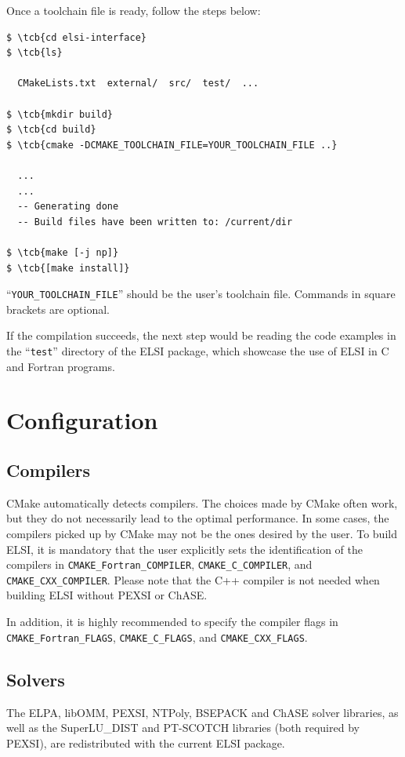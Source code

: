\documentclass{report}
\newcommand{\tcb}[1]{\textcolor{blue}{#1}}
\begin{document}
Once a toolchain file is ready, follow the steps below:
\begin{tcolorbox}
\begin{Verbatim}[commandchars=\\\{\}]
$ \tcb{cd elsi-interface}
$ \tcb{ls}

  CMakeLists.txt  external/  src/  test/  ...

$ \tcb{mkdir build}
$ \tcb{cd build}
$ \tcb{cmake -DCMAKE_TOOLCHAIN_FILE=YOUR_TOOLCHAIN_FILE ..}

  ...
  ...
  -- Generating done
  -- Build files have been written to: /current/dir

$ \tcb{make [-j np]}
$ \tcb{[make install]}
\end{Verbatim}
\end{tcolorbox}

``\texttt{YOUR\_TOOLCHAIN\_FILE}'' should be the user's toolchain file. Commands in square brackets are optional.

If the compilation succeeds, the next step would be reading the code examples in the ``\texttt{test}'' directory of the ELSI package, which showcase the use of ELSI in C and Fortran programs.

\section{Configuration}
\label{sec:config}
\subsection{Compilers}
\label{subsec:config_compilers}
CMake automatically detects compilers. The choices made by CMake often work, but they do not necessarily lead to the optimal performance. In some cases, the compilers picked up by CMake may not be the ones desired by the user. To build ELSI, it is mandatory that the user explicitly sets the identification of the compilers in \texttt{CMAKE\_Fortran\_COMPILER}, \texttt{CMAKE\_C\_COMPILER}, and \texttt{CMAKE\_CXX\_COMPILER}. Please note that the C++ compiler is not needed when building ELSI without PEXSI or ChASE.

In addition, it is highly recommended to specify the compiler flags in \texttt{CMAKE\_Fortran\_FLAGS}, \texttt{CMAKE\_C\_FLAGS}, and \texttt{CMAKE\_CXX\_FLAGS}.

\subsection{Solvers}
\label{subsec:config_solvers}
The ELPA, libOMM, PEXSI, NTPoly, BSEPACK and ChASE solver libraries, as well as the SuperLU\_DIST and PT-SCOTCH libraries (both required by PEXSI), are redistributed with the current ELSI package.
\end{document}
